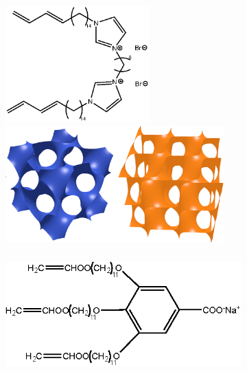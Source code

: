 \documentclass[journal=jpcbfk,manusciprt=article]{achemso}
\begin{document}

  \begin{figure}
  \centering
  \begin{subfigure}{0.45\textwidth}
        \centering
        \includegraphics[trim=-2cm 0 0 0, clip, height=4.5cm]{Dibrpyr14.eps}
        \includegraphics[height=4.5cm]{bcc_phases.png}
        \caption{}\label{fig:bcc_phases}
  \end{subfigure}
  \hspace{1cm}
  \begin{subfigure}{0.45\textwidth}
        \centering
        \includegraphics[trim=0 -0.5cm 0 -0.5cm, clip, height=4.5cm]{NaGA3C11.eps}

\end{subfigure}
\end{figure}
\end{document}
